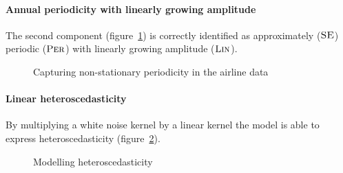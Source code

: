 \documentclass{article}
\begin{document}
\paragraph{Annual periodicity with linearly growing amplitude}

The second component (figure~\ref{fig:lin_periodic}) is correctly identified as approximately (${\textsc{SE}}$) periodic (${\textsc{Per}}$) with linearly growing amplitude (${\textsc{Lin}}$).

\begin{figure}[h]
\centering
{}
\caption{Capturing non-stationary periodicity in the airline data}
\label{fig:lin_periodic}
\end{figure}


\paragraph{Linear heteroscedasticity}

By multiplying a white noise kernel by a linear kernel the model is able to express heteroscedasticity (figure~\ref{fig:heteroscedastic}).

\begin{figure}[h]
\centering
{}
\caption{Modelling heteroscedasticity}
\label{fig:heteroscedastic}
\end{figure}
\end{document}
